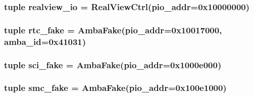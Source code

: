 \label{classRealView_1_1RealViewEB_aea1f4d5125bc4930882b7415e32696dc}
\hypertarget{classRealView_1_1RealViewEB_a54d7e0216558aeb12a980d61e36094da}{
\subsubsection[{realview\_\-io}]{\setlength{\rightskip}{0pt plus 5cm}tuple {\bf realview\_\-io} = {\bf RealViewCtrl}(pio\_\-addr=0x10000000)}}
\label{classRealView_1_1RealViewEB_a54d7e0216558aeb12a980d61e36094da}
\hypertarget{classRealView_1_1RealViewEB_a3b65f0dff3a9ed3be7ee1f74df46a92f}{
\subsubsection[{rtc\_\-fake}]{\setlength{\rightskip}{0pt plus 5cm}tuple {\bf rtc\_\-fake} = {\bf AmbaFake}(pio\_\-addr=0x10017000, amba\_\-id=0x41031)}}
\label{classRealView_1_1RealViewEB_a3b65f0dff3a9ed3be7ee1f74df46a92f}
\hypertarget{classRealView_1_1RealViewEB_a3f48d40a61aee1b51e22944a6926a4c3}{
\subsubsection[{sci\_\-fake}]{\setlength{\rightskip}{0pt plus 5cm}tuple {\bf sci\_\-fake} = {\bf AmbaFake}(pio\_\-addr=0x1000e000)}}
\label{classRealView_1_1RealViewEB_a3f48d40a61aee1b51e22944a6926a4c3}
\hypertarget{classRealView_1_1RealViewEB_ae5f924bae96d172d477be2bfc6df2004}{
\subsubsection[{smc\_\-fake}]{\setlength{\rightskip}{0pt plus 5cm}tuple {\bf smc\_\-fake} = {\bf AmbaFake}(pio\_\-addr=0x100e1000)}}
